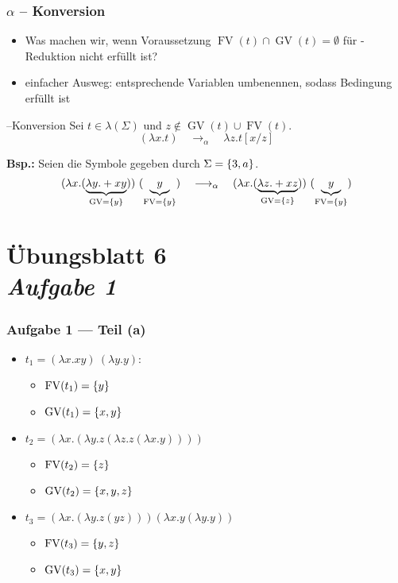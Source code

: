 \documentclass{beamer}
\DeclareMathOperator{\GV}{GV}
\DeclareMathOperator{\FV}{FV}
\begin{document}
\begin{frame} \frametitle{$\alpha$ -- Konversion }
	
	\begin{itemize}
		\item Was machen wir, wenn Voraussetzung $\FV(t) \cap \GV(t) = \emptyset$ für \textbeta-Reduktion nicht erfüllt ist?
		\item einfacher Ausweg: entsprechende Variablen umbenennen, sodass Bedingung erfüllt ist
	\end{itemize}

	\pause
	
	\begin{block}{\textalpha --Konversion}
		Sei $t \in \lambda(\Sigma)$ und $z \notin \GV(t) \cup \FV(t)$.
		\begin{equation*}
			(\lambda x . t) \quad \longrightarrow_\alpha \quad \lambda z . t[x / z]
		\end{equation*}
	\end{block}

	\pause
	
	\textbf{Bsp.:} Seien die Symbole gegeben durch $\Sigma = \left\{ 3,a \right\}$.
	\begin{equation*}
		(\lambda x . (\underbrace{\lambda y . + x y}_{\GV = \menge{y}})) \ (\underbrace{y}_{\FV = \menge{y}}) 
		\quad \longrightarrow_\alpha \quad 
		(\lambda x . (\underbrace{\lambda z . + x z}_{\GV = \menge{z}})) \ (\underbrace{y}_{\FV = \menge{y}})
	\end{equation*}
\end{frame}

\section{Übungsblatt 6 \\ \textit{\normalsize Aufgabe 1}}

\begin{frame} \frametitle{Aufgabe 1 --- Teil (a)}
	\begin{itemize}[<+->]
		\item $t_1 = (\lambda x . x y) \ (\lambda y . y)$:
			\begin{itemize}
				\item $\FV(t_1) = \menge{y}$
				 \item $\GV(t_1) = \menge{x,y}$
			\end{itemize}
		\item $t_2 = (\lambda x . (\lambda y . z (\lambda z . z (\lambda x . y))))$
			\begin{itemize}
				\item $\FV(t_2) = \menge{z}$
				\item $\GV(t_2) = \menge{x,y,z}$
			\end{itemize}
		\item $t_3 = (\lambda x . (\lambda y . z (yz)))(\lambda x . y (\lambda y. y ))$
			\begin{itemize}
				\item $\FV(t_3) = \menge{y,z}$
				\item $\GV(t_3) = \menge{x,y}$
			\end{itemize}
	\end{itemize}
\end{frame}
\end{document}
